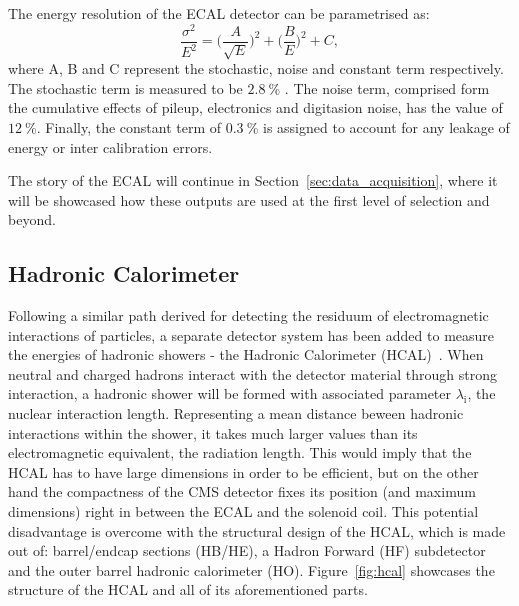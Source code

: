 \hspace{10pt} The energy resolution of the ECAL detector can be parametrised as:
\begin{equation}
    \frac{\sigma^2}{E^2} =\bigg (\frac{A}{\sqrt{E}}\bigg )^2 +\bigg (\frac{B}{E} \bigg )^2 + C,
\end{equation}
where A, B and C represent the stochastic, noise and constant term respectively. The stochastic term is measured to be $2.8~$\% . The noise term, comprised form the cumulative effects of pileup, electronics and digitasion noise, has the value of $12~$\%. Finally, the constant term of $0.3~$\% is assigned to account for any leakage of energy or inter calibration errors. 

\hspace{10pt} The story of the ECAL will continue in Section~\ref{sec:data_acquisition}, where it will be showcased how these outputs are used at the first level of selection and beyond.
\subsection{Hadronic Calorimeter}
\hspace{10pt} Following a similar path derived for detecting the residuum of electromagnetic interactions of particles, a separate detector system has been added to measure the energies of hadronic showers - the Hadronic Calorimeter (HCAL)~\cite{cms:paper}\cite{hcal_performance}. When neutral and charged hadrons interact with the detector material through strong interaction, a hadronic shower will be formed with associated parameter $\lambda_{\text{i}}$, the nuclear interaction length. Representing a mean distance beween hadronic interactions within the shower, it takes much larger values than its electromagnetic equivalent, the radiation length. This would imply that the HCAL has to have large dimensions in order to be efficient, but on the other hand the compactness of the CMS detector fixes its position (and maximum dimensions) right in between the ECAL and the solenoid coil. This potential disadvantage is overcome with the structural design of the HCAL, which is made out of: barrel/endcap sections (HB/HE), a Hadron Forward (HF) subdetector and the outer barrel hadronic calorimeter (HO). Figure~\ref{fig:hcal} showcases the structure of the HCAL and all of its aforementioned parts.


